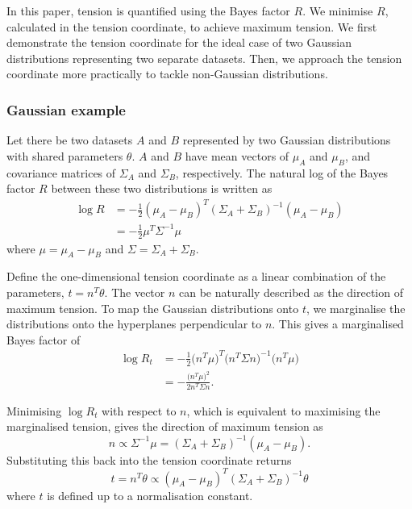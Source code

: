 \documentclass[%
 reprint,
 amsmath,amssymb,
 aps,
]{revtex4-2}
\begin{document}


In this paper, tension is quantified using the Bayes factor $R$. We minimise $R$, calculated in the tension coordinate, to achieve maximum tension. We first demonstrate the tension coordinate for the ideal case of two Gaussian distributions representing two separate datasets. Then, we approach the tension coordinate more practically to tackle non-Gaussian distributions.

\subsubsection{Gaussian example} \label{gaussian_tension}

Let there be two datasets $A$ and $B$ represented by two Gaussian distributions with shared parameters $\theta$. $A$ and $B$ have mean vectors of $\mu_A$ and $\mu_B$, and covariance matrices of $\Sigma_A$ and $\Sigma_B$, respectively. The natural log of the Bayes factor $R$ between these two distributions is written as \cite{Handley2019}
\begin{align}
    \log R &= - \frac{1}{2} (\mu_A - \mu_B)^T (\Sigma_A + \Sigma_B)^{-1} (\mu_A - \mu_B) \\
    &= - \frac{1}{2} \mu^T \Sigma^{-1} \mu
\end{align}
where $\mu = \mu_A - \mu_B$ and $\Sigma = \Sigma_A + \Sigma_B$.

Define the one-dimensional tension coordinate as a linear combination of the parameters, $t = n^T \theta$. The vector $n$ can be naturally described as the direction of maximum tension. To map the Gaussian distributions onto $t$, we marginalise the distributions onto the hyperplanes perpendicular to $n$. This gives a marginalised Bayes factor of
\begin{align}
    \log R_t &= -\frac{1}{2} \big( n^T \mu \big)^T \big( n^T \Sigma n \big)^{-1} \big( n^T \mu \big) \\
    &= -\frac{\big( n^T \mu \big)^2}{2 n^T \Sigma n}.
\end{align}

Minimising $\log R_t$ with respect to $n$, which is equivalent to maximising the marginalised tension, gives the direction of maximum tension as
\begin{equation}
    n \propto \Sigma^{-1} \mu = (\Sigma_A + \Sigma_B)^{-1} (\mu_A - \mu_B).
\end{equation}
Substituting this back into the tension coordinate returns
\begin{equation}
    t = n^T \theta \propto (\mu_A - \mu_B)^T (\Sigma_A + \Sigma_B)^{-1} \theta
\end{equation}
where $t$ is defined up to a normalisation constant.
\end{document}
